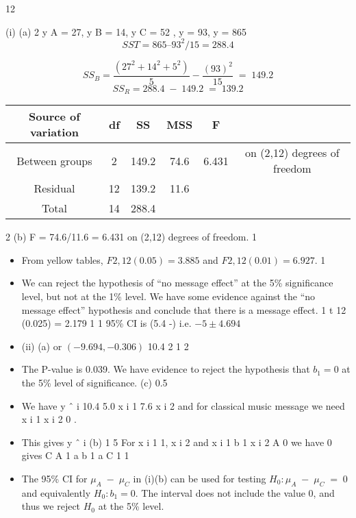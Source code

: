 \documentclass[a4paper,12pt]{article}
\begin{document}
\newpage
12
\item (i)
(a)
2
y A = 27, y B = 14, y C = 52 , y = 93, y = 865
\[SST = 865 – 93^2/15 = 288.4\]


\[SS_B = \frac{(27^2 + 14^2 + 5^2 )}{5} - \frac{(93)^2}{15} \;=\; 149.2 \]
\[SS_R = 288.4 \;-\;149.2 \;=\; 139.2\]

\begin{center}
\begin{tabular}{cccccc}
Source of variation	&	df	&	SS	&	MSS	&	F	&		\\ \hline
Between groups	&	2	&	149.2	&	74.6	&	6.431	&	 on (2,12) degrees of freedom	\\ \hline
Residual	&	12	&	139.2	&	11.6	&		&		\\ \hline
Total	&	14	&	288.4	&		&		&		\\ \hline
\end{tabular}
\end{center}
2
(b)
F = 74.6/11.6 = 6.431 on (2,12) degrees of freedom. 1
\begin{itemize}
\item From yellow tables, $F 2,12 (0.05) = 3.885$ and $F 2,12 (0.01) = 6.927$. 1
\item We can reject the hypothesis of “no message effect” at the 5\% significance level, but not at the 1\% level. We have some evidence
against the “no message effect” hypothesis and conclude that there is a message effect. 1
t 12 (0.025) = 2.179 1
1
95\% CI is (5.4 \;-)  
i.e. $ -5 \pm 4.694$
\item (ii)
(a)
or $(-9.694, -0.306)$
10.4
2
1
2
\item The P-value is 0.039. We have evidence to reject the hypothesis that $b_1 = 0$ at the 5\% level of significance.
(c)
0.5
\item We have y ˆ i 10.4 5.0 x i 1 7.6 x i 2 and for classical music message we need x i 1 x i 2 0 .

\item This gives y ˆ i
(b)
1
5
For x i 1 1, x i 2
and x i 1
b 1
x i 2
A
0 we have
0 gives
C
A
1
a b 1
a
C
1
1
\item The 95\% CI for $\mu_A \;-\; \mu_C$ in (i)(b) can be used for testing $H_0: \mu_A \;-\; \mu_C \;=\; 0$ and equivalently $H_0: b_1 = 0$. The interval does not include the value 0, and thus we reject $H_0$ at the 5\% level.

\end{itemize}
\end{document}
